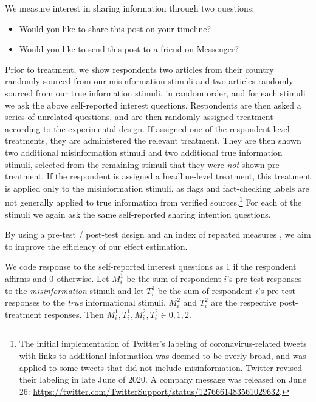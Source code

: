\documentclass[letterpaper, 12pt, parskip=full,]{scrartcl}
\begin{document}
We measure interest in sharing information through two questions:
\begin{itemize}
\item Would you like to share this post on your timeline? 
\item Would you like to send this post to a friend on Messenger?
\end{itemize}

Prior to treatment, we show respondents two articles from their country randomly sourced from our misinformation stimuli and two articles randomly sourced from our true information stimuli, in random order, and for each stimuli we ask the above self-reported interest questions. Respondents are then asked a series of unrelated questions, and are then randomly assigned treatment according to the experimental design. If assigned one of the respondent-level treatments, they are administered the relevant treatment. They are then shown two additional misinformation stimuli and two additional true information stimuli, selected from the remaining stimuli that they were \textit{not} shown pre-treatment. If the respondent is assigned a headline-level treatment, this treatment is applied only to the misinformation stimuli, as flags and fact-checking labels are not generally applied to true information from verified sources.\footnote{The initial implementation of Twitter's labeling of coronavirus-related tweets with links to additional information was deemed to be overly broad, and was applied to some tweets that did not include misinformation. Twitter revised their labeling in late June of 2020. A company message was released on June 26: \url{https://twitter.com/TwitterSupport/status/1276661483561029632}. } For each of the stimuli we again ask the same self-reported sharing intention questions. 

By using a pre-test / post-test design  \citep{davidian2005semiparametric} %
and an index of repeated measures \citep{broockman2017design}, we aim to improve the efficiency of our effect estimation. 


We code response to the self-reported interest questions as 1 if the respondent affirms and 0 otherwise. Let $M_i^1$ be the sum of respondent $i$'s pre-test responses to the \textit{misinformation} stimuli and let $T_i^1$ be the sum of respondent $i$'s pre-test responses to the \textit{true} informational stimuli. $M_i^2$ and $T_i^2$ are the respective post-treatment responses. Then $M_i^1, T_i^1, M_i^2, T_i^2 \in {0,1,2}$. 
\end{document}
